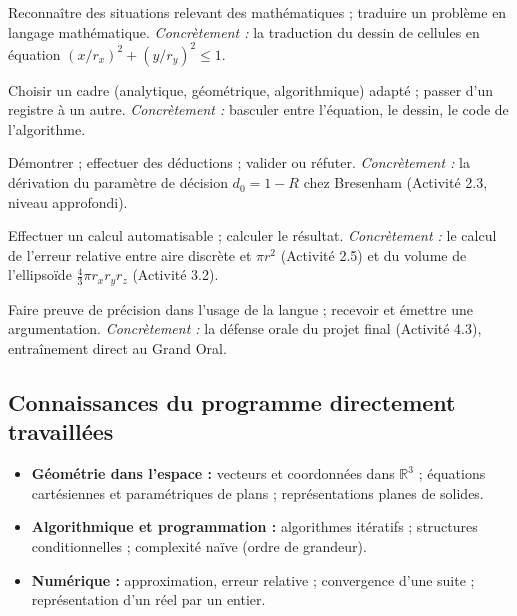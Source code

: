 \documentclass[12pt,a4paper]{scrartcl}
\begin{document}
\begin{competence}[Modéliser]
Reconnaître des situations relevant des mathématiques ; traduire un problème en langage mathématique. \emph{Concrètement :} la traduction du dessin de cellules en équation $(x/r_x)^2 + (y/r_y)^2 \leq 1$.
\end{competence}

\begin{competence}[Représenter]
Choisir un cadre (analytique, géométrique, algorithmique) adapté ; passer d'un registre à un autre. \emph{Concrètement :} basculer entre l'équation, le dessin, le code de l'algorithme.
\end{competence}

\begin{competence}[Raisonner]
Démontrer ; effectuer des déductions ; valider ou réfuter. \emph{Concrètement :} la dérivation du paramètre de décision $d_0 = 1 - R$ chez Bresenham (Activité 2.3, niveau approfondi).
\end{competence}

\begin{competence}[Calculer]
Effectuer un calcul automatisable ; calculer le résultat. \emph{Concrètement :} le calcul de l'erreur relative entre aire discrète et $\pi r^2$ (Activité 2.5) et du volume de l'ellipsoïde $\tfrac{4}{3}\pi r_x r_y r_z$ (Activité 3.2).
\end{competence}

\begin{competence}[Communiquer]
Faire preuve de précision dans l'usage de la langue ; recevoir et émettre une argumentation. \emph{Concrètement :} la défense orale du projet final (Activité 4.3), entraînement direct au Grand Oral.
\end{competence}

\subsection{Connaissances du programme directement travaillées}

\begin{itemize}[leftmargin=1.3em,itemsep=0.15em,topsep=0.3em]
  \item \textbf{Géométrie dans l'espace :} vecteurs et coordonnées dans $\mathbb{R}^3$ ; équations cartésiennes et paramétriques de plans ; représentations planes de solides.
  \item \textbf{Algorithmique et programmation :} algorithmes itératifs ; structures conditionnelles ; complexité naïve (ordre de grandeur).
  \item \textbf{Numérique :} approximation, erreur relative ; convergence d'une suite ; représentation d'un réel par un entier.
\end{itemize}
\end{document}

